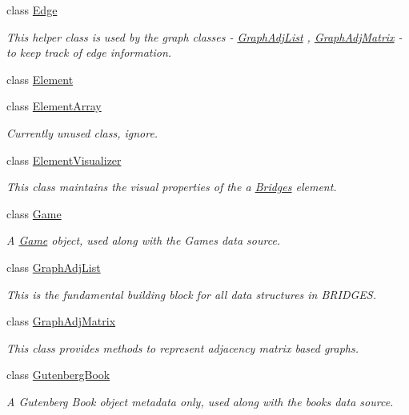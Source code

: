 \begin{DoxyCompactItemize}
class \hyperlink{classbridges_1_1_edge}{Edge}
\begin{DoxyCompactList}\small\item\em This helper class is used by the graph classes -\/ \hyperlink{classbridges_1_1_graph_adj_list}{Graph\+Adj\+List} , \hyperlink{classbridges_1_1_graph_adj_matrix}{Graph\+Adj\+Matrix} -\/ to keep track of edge information. \end{DoxyCompactList}\item 
class \hyperlink{classbridges_1_1_element}{Element}
\item 
class \hyperlink{classbridges_1_1_element_array}{Element\+Array}
\begin{DoxyCompactList}\small\item\em Currently unused class, ignore. \end{DoxyCompactList}\item 
class \hyperlink{classbridges_1_1_element_visualizer}{Element\+Visualizer}
\begin{DoxyCompactList}\small\item\em This class maintains the visual properties of the a \hyperlink{namespacebridges_1_1_bridges}{Bridges} element. \end{DoxyCompactList}\item 
class \hyperlink{classbridges_1_1_game}{Game}
\begin{DoxyCompactList}\small\item\em A \hyperlink{classbridges_1_1_game}{Game} object, used along with the Games data source. \end{DoxyCompactList}\item 
class \hyperlink{classbridges_1_1_graph_adj_list}{Graph\+Adj\+List}
\begin{DoxyCompactList}\small\item\em This is the fundamental building block for all data structures in B\+R\+I\+D\+G\+E\+S. \end{DoxyCompactList}\item 
class \hyperlink{classbridges_1_1_graph_adj_matrix}{Graph\+Adj\+Matrix}
\begin{DoxyCompactList}\small\item\em This class provides methods to represent adjacency matrix based graphs. \end{DoxyCompactList}\item 
class \hyperlink{classbridges_1_1_gutenberg_book}{Gutenberg\+Book}
\begin{DoxyCompactList}\small\item\em A Gutenberg Book object metadata only, used along with the books data source. \end{DoxyCompactList}\item 

\end{DoxyCompactItemize}
